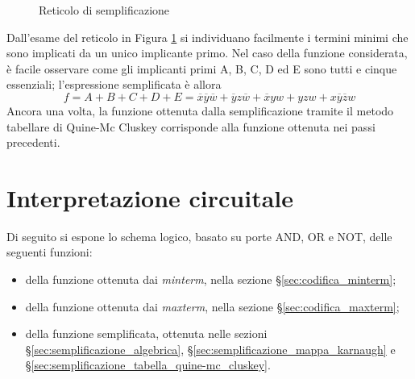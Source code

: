 \documentclass[a4paper]{extarticle}
\begin{document}
\begin{figure}[H]
    \centering
    \caption{Reticolo di semplificazione}
    \label{fig:reticolo_semplificazione}
\end{figure}

\noindent
Dall’esame del reticolo in Figura \ref{fig:reticolo_semplificazione} si individuano facilmente i termini minimi che sono implicati da un unico implicante primo. Nel caso della funzione considerata, è facile osservare come gli implicanti primi A, B, C, D ed E sono tutti e cinque essenziali; l’espressione semplificata è allora
\[f = A + B + C + D + E = \overline{x}\overline{y}\overline{w} + \overline{y}z\overline{w} + \overline{x}yw + yzw + x\overline{y}\overline{z}w\]
Ancora una volta, la funzione ottenuta dalla semplificazione tramite il metodo tabellare
di Quine-Mc Cluskey corrisponde alla funzione ottenuta nei passi precedenti.

\newpage
\section{Interpretazione circuitale}
Di seguito si espone lo schema logico, basato su porte AND, OR e NOT, delle seguenti funzioni:
\begin{itemize}
  \item della funzione ottenuta dai \emph{minterm}, nella sezione §\ref{sec:codifica_minterm};
  \item della funzione ottenuta dai \emph{maxterm}, nella sezione §\ref{sec:codifica_maxterm};
  \item della funzione semplificata, ottenuta nelle sezioni §\ref{sec:semplificazione_algebrica}, §\ref{sec:semplificazione_mappa_karnaugh} e §\ref{sec:semplificazione_tabella_quine-mc_cluskey}.
\end{itemize}
\end{document}
